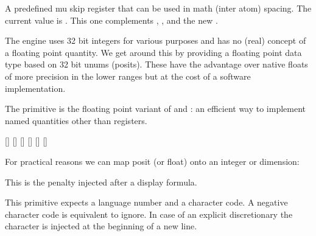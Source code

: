 \stopnewprimitive

\startnewprimitive[title={\prm {pettymuskip}}]

A predefined mu skip register that can be used in math (inter atom) spacing. The
current value is {\tt \the\pettymuskip}. This one complements ,
,  and the new .

\stopnewprimitive

\startnewprimitive[title={\prm {positdef}}]

The engine uses 32 bit integers for various purposes and has no (real) concept of
a floating point quantity. We get around this by providing a floating point data
type based on 32 bit unums (posits). These have the advantage over native floats
of more precision in the lower ranges but at the cost of a software
implementation.

The  primitive is the floating point variant of 
and : an efficient way to implement named quantities other
than registers.

\startbuffer
\positdef     {}
\positdef     {}
[\the\MyFloatA] [\todimension\MyFloatA] [\tointeger\MyFloatA]
[\the\MyFloatB] [\todimension\MyFloatB] [\tointeger\MyFloatB]
\stopbuffer

\typebuffer

For practical reasons we can map posit (or float) onto an integer or dimension:

\startlines
\getbuffer
\stoplines


\stopnewprimitive

\startoldprimitive[title={\prm {postdisplaypenalty}}]

This is the penalty injected after a display formula.

\stopoldprimitive

\startnewprimitive[title={\prm {postexhyphenchar}}]

This primitive expects a language number and a character code. A negative
character code is equivalent to ignore. In case of an explicit discretionary the
character is injected at the beginning of a new line.

\stopnewprimitive

\startnewprimitive[title={\prm {posthyphenchar}}]

